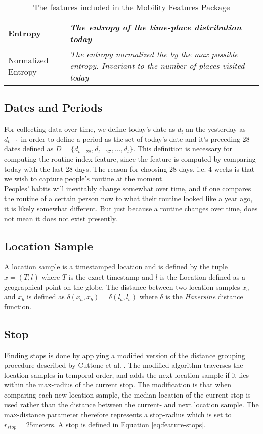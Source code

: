 \begin{table}[h]
\begin{tabular}{|p{}|p{}|}
    Entropy            & \textit{The entropy of the time-place distribution today}                                                             \\ \hline
    Normalized Entropy & \textit{The entropy normalized the by the max possible entropy. Invariant to the number of places visited today}      \\ \hline
    \end{tabular}
    \caption{The features included in the Mobility Features Package}
    \label{tab:features-nilsson}
\end{table}

\subsection{Dates and Periods}
For collecting data over time, we define today's date as $d_t$ an the yesterday as $d_{t-1}$ in order to define a period as the set of today's date and it's preceding 28 dates defined as $D = \{d_{t-28}, d_{t-27}, ..., d_{t}\}$. This definition is necessary for computing the routine index feature, since the feature is computed by comparing today with the last 28 days. The reason for choosing 28 days, i.e. 4 weeks is that we wish to capture people's routine at the moment. \\

Peoples' habits will inevitably change somewhat over time, and if one compares the routine of a certain person now to what their routine looked like a year ago, it is likely somewhat different. But just because a routine changes over time, does not mean it does not exist presently.

\subsection{Location Sample}
A location sample is a timestamped location and is defined by the tuple $x = (T, l)$ where $T$ is the exact timestamp and $l$ is the Location defined as a geographical point on the globe. The distance between two location samples $x_a$ and $x_b$ is defined as $\delta(x_a, x_b) = \delta(l_a, l_b)$ where $\delta$ is the \textit{Haversine} distance function.

\subsection{Stop}
Finding stops is done by applying a modified version of the distance grouping procedure described by Cuttone et al. \cite{sparse-location-2014}. The modified algorithm traverses the location samples in temporal order, and adds the next location sample if it lies within the max-radius of the current stop. The modification is that when comparing each new location sample, the median location of the current stop is used rather than the distance between the current- and next location sample. The max-distance parameter therefore represents a stop-radius which is set to $r_{stop} = 25 \text{meters}$.  A stop is defined in Equation \eqref{eq:feature-stops}.

